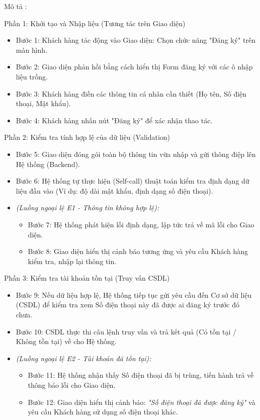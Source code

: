 \documentclass[../BTL.tex]{subfiles}
\begin{document}
Mô tả :

Phần 1: Khởi tạo và Nhập liệu (Tương tác trên Giao diện)

\begin{itemize}
\item
  Bước 1: Khách hàng tác động vào Giao diện: Chọn chức năng "Đăng ký"
  trên màn hình.
\item
  Bước 2: Giao diện phản hồi bằng cách hiển thị Form đăng ký với các ô
  nhập liệu trống.
\item
  Bước 3: Khách hàng điền các thông tin cá nhân cần thiết (Họ tên, Số
  điện thoại, Mật khẩu).
\item
  Bước 4: Khách hàng nhấn nút "Đăng ký" để xác nhận thao tác.
\end{itemize}

Phần 2: Kiểm tra tính hợp lệ của dữ liệu (Validation)

\begin{itemize}
\item
  Bước 5: Giao diện đóng gói toàn bộ thông tin vừa nhập và gửi thông
  điệp lên Hệ thống (Backend).
\item
  Bước 6: Hệ thống tự thực hiện (Self-call) thuật toán kiểm tra định
  dạng dữ liệu đầu vào (Ví dụ: độ dài mật khẩu, định dạng số điện
  thoại).
\item
  \emph{(Luồng ngoại lệ E1 - Thông tin không hợp lệ):}

  \begin{itemize}
  \item
    Bước 7: Hệ thống phát hiện lỗi định dạng, lập tức trả về mã lỗi cho
    Giao diện.
  \item
    Bước 8: Giao diện hiển thị cảnh báo tương ứng và yêu cầu Khách hàng
    kiểm tra, nhập lại thông tin.
  \end{itemize}
\end{itemize}

Phần 3: Kiểm tra tài khoản tồn tại (Truy vấn CSDL)

\begin{itemize}
\item
  Bước 9: Nếu dữ liệu hợp lệ, Hệ thống tiếp tục gửi yêu cầu đến Cơ sở dữ
  liệu (CSDL) để kiểm tra xem Số điện thoại này đã được ai đăng ký trước
  đó chưa.
\item
  Bước 10: CSDL thực thi câu lệnh truy vấn và trả kết quả (Có tồn tại /
  Không tồn tại) về cho Hệ thống.
\item
  \emph{(Luồng ngoại lệ E2 - Tài khoản đã tồn tại):}

  \begin{itemize}
  \item
    Bước 11: Hệ thống nhận thấy Số điện thoại đã bị trùng, tiến hành trả
    về thông báo lỗi cho Giao diện.
  \item
    Bước 12: Giao diện hiển thị cảnh báo: \emph{"Số điện thoại đã được
    đăng ký"} và yêu cầu Khách hàng sử dụng số điện thoại khác.
  \end{itemize}
\end{itemize}
\end{document}
